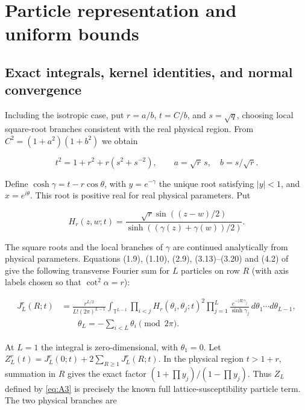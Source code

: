 \documentclass[11pt,a4paper]{article}
\numberwithin{equation}{section}
\theoremstyle{plain}
\theoremstyle{definition}
\begin{document}
\section{Particle representation and uniform bounds}\label{sec:anisotropy}

\subsection{Exact integrals, kernel identities, and normal convergence}\label{sec:anisexp}

Including the isotropic case, put \(r=a/b\), \(t=C/b\), and \(s=\sqrt{q}\), choosing local square-root branches consistent with the real physical region. From \(C^2=(1+a^2)(1+b^2)\) we obtain

\begin{equation}
t^2=1+r^2+r(s^2+s^{-2}),\qquad a=\sqrt r\,s,\quad b=s/\sqrt r.
\label{eq:A1}
\end{equation}

Define \(\cosh\gamma=t-r\cos\theta\), with \(y=e^{-\gamma}\) the unique root satisfying \(|y|<1\), and \(x=e^{i\theta}\). This root is positive real for real physical parameters. Put

\begin{equation}
H_r(z,w;t)=\frac{\sqrt r\sin((z-w)/2)}{\sinh((\gamma(z)+\gamma(w))/2)}.
\label{eq:A2}
\end{equation}

The square roots and the local branches of \(\gamma\) are continued analytically from physical parameters. Equations (1.9), (1.10), (2.9), (3.13)--(3.20) and (4.2) of~\cite{orrick} give the following transverse Fourier sum for $L$ particles on row $R$ (with axis labels chosen so that $\cot^2\alpha=r$):

\begin{equation}
\begin{aligned} J_L^{r}(R;t)&=\frac{r^{L/2}}{L!(2\pi)^{L-1}}\int_{\mathbb T^{L-1}}\prod_{i<j}H_r(\theta_i,\theta_j;t)^2\prod_{j=1}^L\frac{e^{-|R|\gamma_j}}{\sinh\gamma_j}\,d\theta_1\cdots d\theta_{L-1},\\ &\qquad \theta_L=-\sum_{i<L}\theta_i\pmod{2\pi}.\end{aligned}
\label{eq:A3}
\end{equation}

At \(L=1\) the integral is zero-dimensional, with \(\theta_1=0\). Let \(Z_L^r(t)=J_L^r(0;t)+2\sum_{R\ge1}J_L^r(R;t)\). In the physical region \(t>1+r\), summation in \(R\) gives the exact factor \((1+\prod y_j)/(1-\prod y_j)\). Thus \(Z_L\) defined by \eqref{eq:A3} is precisely the known full lattice-susceptibility particle term. The two physical branches are
\end{document}
